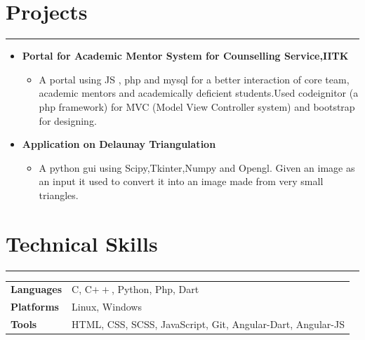 \documentclass[a4paper]{article}
\begin{document}
 
\section*{Projects}
\hrule
\vspace{3mm}
  \begin{itemize}
   \item 
   \textbf{Portal for Academic Mentor System for Counselling Service,IITK}
	   \begin{itemize}
	    \item A portal using JS , php and mysql for a better interaction of core team, academic mentors and academically 
		  deficient students.Used codeignitor (a php framework) for MVC (Model View Controller system) 
		  and bootstrap for designing.
	   \end{itemize}
    \item
      \textbf{Application on Delaunay  Triangulation}
	\begin{itemize}
	 \item A python gui using Scipy,Tkinter,Numpy and Opengl. 
	      Given an image as an input it used to convert it into an image made from very small triangles.
	\end{itemize}
  \end{itemize}

  
 \section*{Technical Skills}
 \hrule
 \vspace{3mm}
  \begin{tabular}{@{}m{4.0cm}m{13cm}@{}}
   \textbf{\textrm{Languages}} & 
C, C$++$, Python, Php, Dart\\
    
  \textbf{\textrm{Platforms}} &
  Linux, Windows\\
  
  \textbf{\textrm{Tools}} &
  HTML, CSS, SCSS, JavaScript, Git, Angular-Dart, Angular-JS\\
  \end{tabular}
\end{document}
